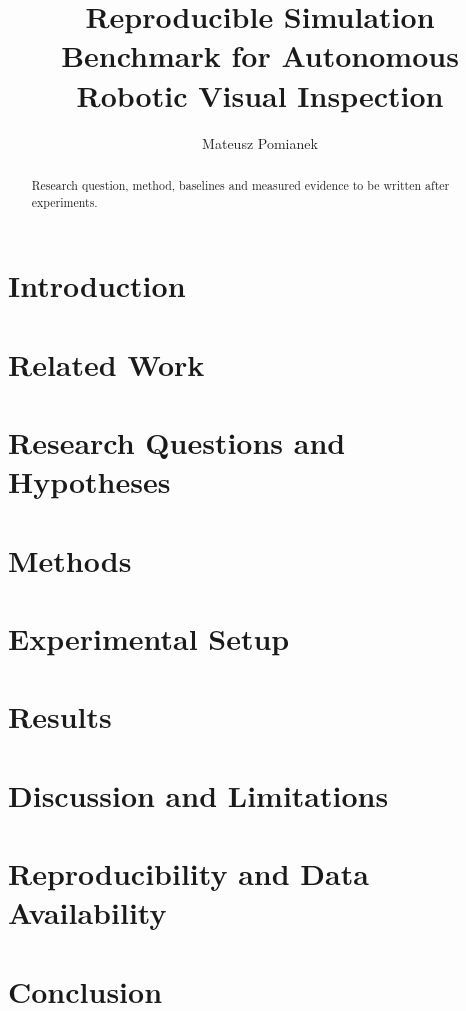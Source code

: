 \documentclass[11pt,a4paper]{article}
\title{Reproducible Simulation Benchmark for Autonomous Robotic Visual Inspection}
\author{Mateusz Pomianek}
\date{}
\begin{document}
\maketitle
\begin{abstract}
Research question, method, baselines and measured evidence to be written after experiments.
\end{abstract}
\section{Introduction}
\section{Related Work}
\section{Research Questions and Hypotheses}
\section{Methods}
\section{Experimental Setup}
\section{Results}
\section{Discussion and Limitations}
\section{Reproducibility and Data Availability}
\section{Conclusion}
\end{document}
